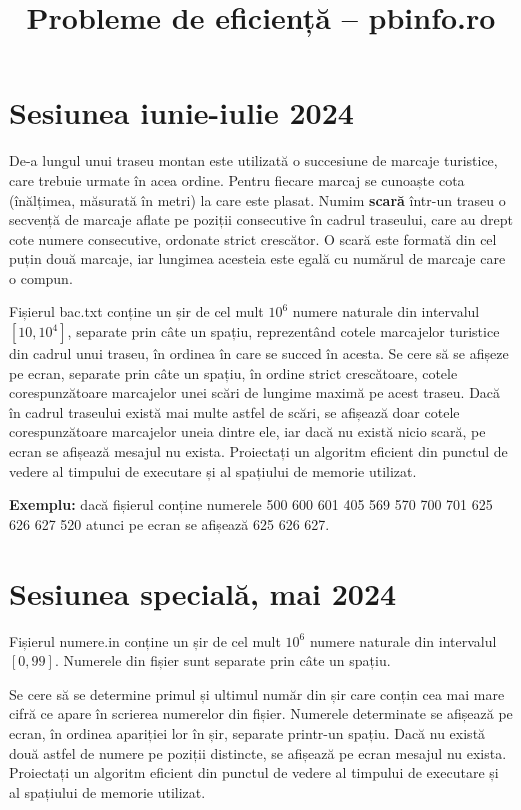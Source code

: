 \documentclass[10pt, a4paper]{article}
\title{\textbf{Probleme de eficiență – pbinfo.ro}}
\date{}
\newcommand{\highlight}[1]{{\ttfamily\color{red}#1}}
\begin{document}
\maketitle

\section{Sesiunea iunie-iulie 2024}
De-a lungul unui traseu montan este utilizată o succesiune de marcaje turistice, care trebuie urmate în acea ordine. Pentru fiecare marcaj se cunoaște cota (înălțimea, măsurată în metri) la care este plasat. Numim \textbf{scară} într-un traseu o secvență de marcaje aflate pe poziții consecutive în cadrul traseului, care au drept cote numere consecutive, ordonate strict crescător. O scară este formată din cel puțin două marcaje, iar lungimea acesteia este egală cu numărul de marcaje care o compun.

\vspace{0.2cm}
\noindent Fișierul \highlight{bac.txt} conține un șir de cel mult \highlight{$10^6$} numere naturale din intervalul \highlight{$[10,10^4]$}, separate prin câte un spațiu, reprezentând cotele marcajelor turistice din cadrul unui traseu, în ordinea în care se succed în acesta. Se cere să se afișeze pe ecran, separate prin câte un spațiu, în ordine strict crescătoare, cotele corespunzătoare marcajelor unei scări de lungime maximă pe acest traseu. Dacă în cadrul traseului există mai multe astfel de scări, se afișează doar cotele corespunzătoare marcajelor uneia dintre ele, iar dacă nu există nicio scară, pe ecran se afișează mesajul \highlight{nu exista}. Proiectați un algoritm eficient din punctul de vedere al timpului de executare și al spațiului de memorie utilizat.

\vspace{0.2cm}
\noindent \textbf{Exemplu:} dacă fișierul conține numerele \highlight{500 600 601 405 569 570 700 701 625 626 627 520} atunci pe ecran se afișează \highlight{625 626 627}.


\section{Sesiunea specială, mai 2024}
Fișierul \highlight{numere.in} conține un șir de cel mult \highlight{$10^6$} numere naturale din intervalul \highlight{$[0,99]$}. Numerele din fișier sunt separate prin câte un spațiu.

\vspace{0.2cm}
\noindent Se cere să se determine primul și ultimul număr din șir care conțin cea mai mare cifră ce apare în scrierea numerelor din fișier. Numerele determinate se afișează pe ecran, în ordinea apariției lor în șir, separate printr-un spațiu. Dacă nu există două astfel de numere pe poziții distincte, se afișează pe ecran mesajul \highlight{nu exista}. Proiectați un algoritm eficient din punctul de vedere al timpului de executare și al spațiului de memorie utilizat.
\end{document}
